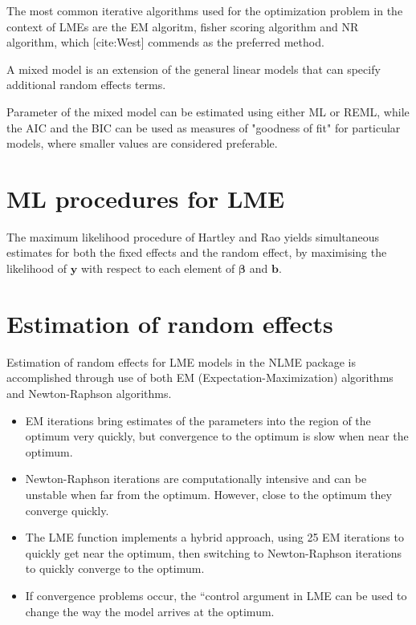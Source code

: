 \documentclass[Chap4amain.tex]{subfiles}
\begin{document}
The most common iterative algorithms used for the optimization
problem in the context of LMEs are the EM algoritm, fisher scoring
algorithm and NR algorithm, which [cite:West] commends as the
preferred method.

A mixed model is an extension of the general linear models that
can specify additional random effects terms.

Parameter of the mixed model can be estimated using either ML or
REML, while the AIC and the BIC can be used as measures of
"goodness of fit" for particular models, where smaller values are
considered preferable.


\section{ML procedures for LME}

The maximum likelihood procedure of Hartley and Rao yields
simultaneous estimates for both the fixed effects and the random
effect, by maximising the likelihood of $\boldsymbol{y}$ with
respect to each element of $\boldsymbol{\beta}$ and
$\boldsymbol{b}$.


\newpage
\section{Estimation of random effects}

Estimation of random effects for LME models in the NLME package is accomplished through use
of both EM (Expectation-Maximization) algorithms and Newton-Raphson algorithms.
\begin{itemize}
\item EM iterations bring estimates of the parameters into the region of the optimum very quickly, but
convergence to the optimum is slow when near the optimum.
\item Newton-Raphson iterations are computationally intensive and can be unstable when far from the
optimum. However, close to the optimum they converge quickly.
\item The LME function implements a hybrid approach, using 25 EM iterations to quickly get near the
optimum, then switching to Newton-Raphson iterations to quickly converge to the optimum. \item If
convergence problems occur, the ``control argument in LME can be used to change the way the
model arrives at the optimum.
\end{itemize}



\end{document}
